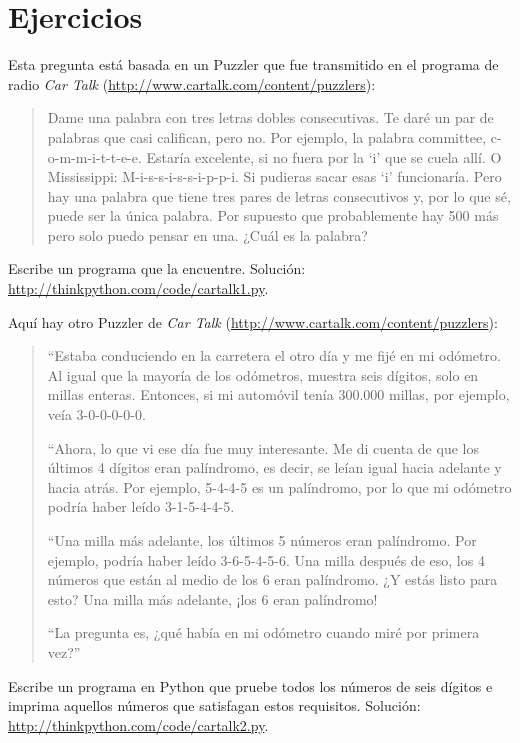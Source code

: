 \documentclass[10pt]{book}
\begin{document}
\section{Ejercicios}

\begin{exercise}

Esta pregunta está basada en un Puzzler que fue transmitido en el programa
de radio {\em Car Talk}
(\url{http://www.cartalk.com/content/puzzlers}):

\begin{quote}
Dame una palabra con tres letras dobles consecutivas. Te daré un
par de palabras que casi califican, pero no. Por ejemplo, la palabra
committee, c-o-m-m-i-t-t-e-e. Estaría excelente, si no fuera por la `i' que
se cuela allí. O Mississippi: M-i-s-s-i-s-s-i-p-p-i. Si pudieras
sacar esas `i' funcionaría. Pero hay una palabra que tiene tres
pares de letras consecutivos y, por lo que sé, puede ser
la única palabra. Por supuesto que probablemente hay 500 más pero solo puedo
pensar en una. ¿Cuál es la palabra?
\end{quote}

Escribe un programa que la encuentre.
Solución: \url{http://thinkpython.com/code/cartalk1.py}.

\end{exercise}


\begin{exercise}
Aquí hay otro Puzzler de {\em Car Talk}
(\url{http://www.cartalk.com/content/puzzlers}):

\begin{quote}
``Estaba conduciendo en la carretera el otro día y me fijé en
mi odómetro. Al igual que la mayoría de los odómetros, muestra seis dígitos,
solo en millas enteras. Entonces, si mi automóvil tenía 300.000
millas, por ejemplo, veía 3-0-0-0-0-0.

``Ahora, lo que vi ese día fue muy interesante. Me di cuenta de que los
últimos 4 dígitos eran palíndromo, es decir, se leían igual hacia adelante
y hacia atrás. Por ejemplo, 5-4-4-5 es un palíndromo, por lo que mi odómetro
podría haber leído 3-1-5-4-4-5.

``Una milla más adelante, los últimos 5 números eran palíndromo. Por ejemplo,
podría haber leído 3-6-5-4-5-6.  Una milla después de eso, los 4 números que están
al medio de los 6 eran palíndromo.  ¿Y estás listo para esto? Una milla más adelante,
¡los 6 eran palíndromo!

``La pregunta es, ¿qué había en mi odómetro cuando miré por primera vez?''
\end{quote}

Escribe un programa en Python que pruebe todos los números de seis dígitos e imprima
aquellos números que satisfagan estos requisitos.
Solución: \url{http://thinkpython.com/code/cartalk2.py}.

\end{exercise}
\end{document}
